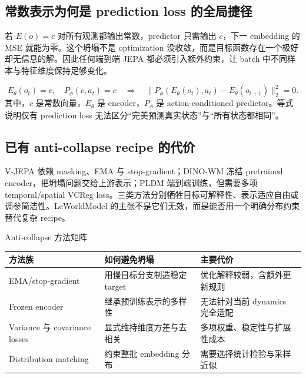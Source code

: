 \subsection{常数表示为何是 prediction loss 的全局捷径}

若 $E(o)=c$ 对所有观测都输出常数，predictor 只需输出 $c$，下一 embedding 的 MSE 就能为零。这个坍塌不是 optimization 没收敛，而是目标函数存在一个极好却无信息的解。因此任何端到端 JEPA 都必须引入额外约束，让 batch 中不同样本与特征维度保持足够变化。


\[
E_\theta(o_t)=c,\quad
P_\phi(c,a_t)=c
\quad\Longrightarrow\quad
\|P_\phi(E_\theta(o_t),a_t)-E_\theta(o_{t+1})\|_2^2=0.
\]
其中，$c$ 是常数向量，$E_\theta$ 是 encoder，$P_\phi$ 是 action-conditioned predictor。等式说明仅有 prediction loss 无法区分``完美预测真实状态''与``所有状态都相同''。

\subsection{已有 anti-collapse recipe 的代价}

V-JEPA 依赖 masking、EMA 与 stop-gradient；DINO-WM 冻结 pretrained encoder，把坍塌问题交给上游表示；PLDM 端到端训练，但需要多项 temporal/spatial VCReg loss。三类方法分别牺牲目标可解释性、表示适应自由或调参简洁性。LeWorldModel 的主张不是它们无效，而是能否用一个明确分布约束替代复杂 recipe。



\begin{knowledgebox}{Anti-collapse 方法矩阵}
\begin{tabularx}{\textwidth}{L{0.19\textwidth} L{0.24\textwidth} X}
\toprule
方法族 & 如何避免坍塌 & 主要代价 \\
\midrule
EMA/stop-gradient & 用慢目标分支制造稳定 target & 优化解释较弱，含额外更新规则 \\
Frozen encoder & 继承预训练表示的多样性 & 无法针对当前 dynamics 完全适配 \\
Variance 与 covariance losses & 显式维持维度方差与去相关 & 多项权重、稳定性与扩展性成本 \\
Distribution matching & 约束整批 embedding 分布 & 需要选择统计检验与采样近似 \\
\bottomrule
\end{tabularx}
\end{knowledgebox}

